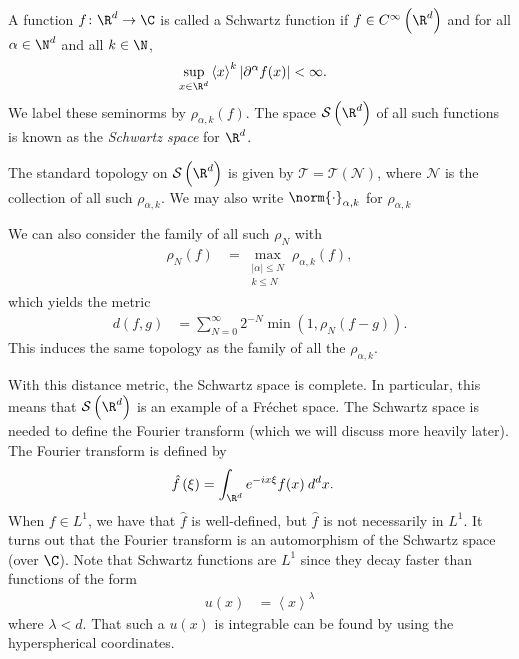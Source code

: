 \documentclass[10pt]{mypackage}
\begin{document}
\begin{example}
  A function $f\colon \R^d\rightarrow \C$ is called a Schwartz function if $f\in C^{\infty}\left( \R^d \right)$ and for all $\alpha\in \N^d$ and all $k\in \N$,
  \begin{align*}
    \sup_{x\in \R^d} \left\langle x \right\rangle^{k} \left\vert \partial^{\alpha}f(x) \right\vert &< \infty.
  \end{align*}
  We label these seminorms by $\rho_{\alpha,k}(f)$. The space $ \mathcal{S}\left( \R^d \right) $ of all such functions is known as the \textit{Schwartz space} for $\R^d$.

  The standard topology on $ \mathcal{S}\left( \R^d \right) $  is given by $ \mathcal{T} = \mathcal{T}\left( \mathcal{N} \right) $, where $ \mathcal{N} $ is the collection of all such $\rho_{\alpha,k}$. We may also write $\norm{\cdot}_{\alpha,k}$ for $\rho_{\alpha,k}$

  We can also consider the family of all such $\rho_N$ with
  \begin{align*}
    \rho_N\left( f \right) &= \max_{\substack{ \left\vert \alpha \right\vert\leq N\\k\leq N }} \rho_{\alpha,k}(f),
  \end{align*}
  which yields the metric
  \begin{align*}
    d\left( f,g \right) &= \sum_{N=0}^{\infty} 2^{-N} \min\left( 1, \rho_N\left( f-g \right) \right).
  \end{align*}
  This induces the same topology as the family of all the $\rho_{\alpha,k}$.

  With this distance metric, the Schwartz space is complete. In particular, this means that $\mathcal{S}\left( \R^d \right)$ is an example of a Fréchet space. The Schwartz space is needed to define the Fourier transform (which we will discuss more heavily later). The Fourier transform is defined by
  \begin{align*}
    \hat{f}\left( \xi \right) &= \int_{\R^d}^{} e^{-ix\xi}f(x)\:d^{d}x.
  \end{align*}
  When $f\in L^1$, we have that $\hat{f}$ is well-defined, but $\hat{f}$ is not necessarily in $L^1$. It turns out that the Fourier transform is an automorphism of the Schwartz space (over $\C$). Note that Schwartz functions are $L^1$ since they decay faster than functions of the form
  \begin{align*}
    u(x) &= \left\langle x \right\rangle^{\lambda}
  \end{align*}
  where $\lambda < d$. That such a $u(x)$ is integrable can be found by using the hyperspherical coordinates.
\end{example}
\end{document}
